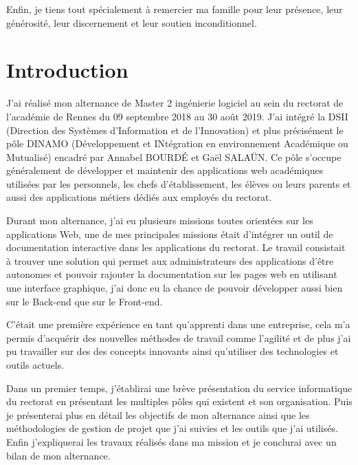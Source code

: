 \documentclass[12pt]{article}
\begin{document}
Enfin, je tiens tout spécialement à remercier ma famille pour leur présence, leur générosité, leur discernement et leur soutien inconditionnel. 

\newpage


\section{Introduction}

J'ai réalisé mon alternance de Master 2 ingénierie logiciel au sein du rectorat de l'académie de Rennes du 09 septembre 2018 au 30 août 2019. J'ai intégré la DSII (Direction des Systèmes d'Information et de l'Innovation) et plus précisément le pôle DINAMO (Développement et INtégration en environnement Académique ou Mutualisé) encadré par Annabel BOURDÉ et Gaël SALAÜN. Ce pôle s'occupe généralement de développer et maintenir des applications web académiques utilisées par les personnels, les chefs d'établissement, les élèves  ou leurs parents et aussi des applications métiers dédiés aux employés du rectorat.\newline


Durant mon alternance, j'ai eu plusieurs missions toutes orientées sur les  applications Web, une de mes principales missions était d'intégrer un outil de documentation interactive dans les applications du rectorat. Le travail consistait à trouver une solution qui permet aux administrateurs des applications d'être autonomes et pouvoir rajouter la documentation sur les pages web en utilisant une interface graphique, j'ai donc eu la chance de pouvoir développer aussi bien sur le Back-end que sur le Front-end.\newline   

C'était une première expérience en tant qu'apprenti dans une entreprise, cela m'a permis d'acquérir des nouvelles méthodes de travail comme l'agilité et de plus j'ai pu travailler sur des des concepts innovants ainsi qu'utiliser des technologies et outils actuels.\newline


Dans un premier temps, j'établirai une brève présentation du service informatique du rectorat en présentant les multiples pôles qui existent et son organisation. Puis je présenterai plus en détail les objectifs de mon alternance ainsi que les méthodologies de gestion de projet que j'ai suivies et les outils que j'ai utilisés. Enfin j'expliquerai les travaux réalisés dans ma mission et je conclurai avec un bilan de mon alternance.
\end{document}
